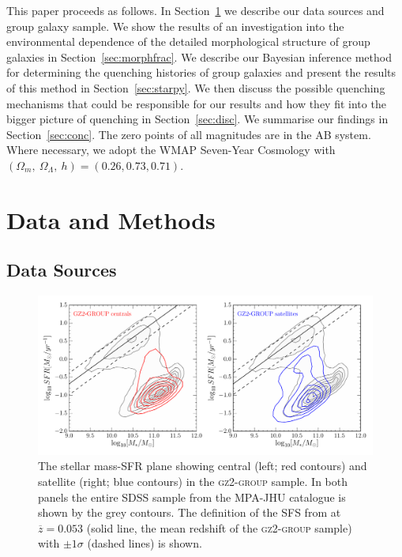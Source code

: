 \documentclass[useAMS,usenatbib]{mn2e}
\begin{document}
This paper proceeds as follows. In Section~\ref{sec:data} we describe our data sources and group galaxy sample. We show the results of an investigation into the environmental dependence of the detailed morphological structure of group galaxies in Section~\ref{sec:morphfrac}. We describe our Bayesian inference method for determining the quenching histories of group galaxies and present the results of this method in Section~\ref{sec:starpy}. We then discuss the possible quenching mechanisms that could be responsible for our results and how they fit into the bigger picture of quenching in Section~\ref{sec:disc}. We summarise our findings in Section~\ref{sec:conc}. The zero points of all magnitudes are in the AB system. Where necessary, we adopt the WMAP Seven-Year Cosmology \citep{jarosik11} with $(\Omega_m , ~\Omega_\Lambda , ~h) = (0.26, 0.73, 0.71)$.

 
\section{Data and Methods}\label{sec:data}

\subsection{Data Sources}\label{sec:photo}

\begin{figure}
\centering
\includegraphics[width=\textwidth]{sfr_mass_quenched_centrals_satellites_gz2_group.pdf}
\caption[Stellar mass-SFR plane for the centrals and satellites of the \textsc{gz2-group} sample]{The stellar mass-SFR plane showing central (left; red contours) and satellite (right; blue contours) in the \textsc{gz2-group} sample. In both panels the entire SDSS sample from the MPA-JHU catalogue is shown by the grey contours. The definition of the SFS from \cite{peng10} at $\overline{z} = 0.053$ (solid line, the mean redshift of the \textsc{gz2-group} sample) with $\pm1\sigma$ (dashed lines) is shown.}
\label{fig:sfrmass}
\end{figure}
\end{document}
